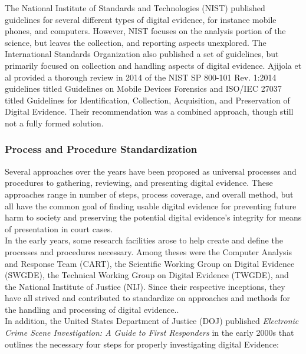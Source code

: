 \documentclass[12pt]{article}
\begin{document}
The National Institute of Standards and Technologies (NIST) published guidelines for several
different types of digital evidence, for instance mobile phones, and computers.
However, NIST focuses on the analysis portion of the science, but leaves the collection,
and reporting aspects unexplored.  The International Standards Organization also published
a set of guidelines, but primarily focused on collection and handling aspects of digital
evidence.  
Ajijola et al\cite{ajijola2014review} provided a thorough review in 2014 of the NIST SP
800-101 Rev. 1:2014 guidelines
titled Guidelines on Mobile Devices Forensics and ISO/IEC 27037 titled
Guidelines for
Identification, Collection, Acquisition, and Preservation of Digital Evidence.
Their recommendation was a combined approach, though still not a fully formed solution.\\

\subsubsection{Process and Procedure Standardization}

Several approaches over the years have been proposed as universal processes and procedures to
gathering, reviewing, and presenting digital evidence.  These approaches range in number of
steps, process coverage, and overall method, 
but all have the common goal of finding usable digital evidence for preventing future
harm to society and preserving the potential digital evidence's 
integrity for means of presentation in court cases.\\

In the early years, some research facilities arose to help create and define the processes
and procedures necessary.  Among theses were the Computer Analysis and
Response Team (CART), the Scientific Working Group on Digital Evidence (SWGDE), the
Technical Working Group on Digital Evidence (TWGDE), and the National Institute of
Justice (NIJ).  Since their respective inceptions, they have all strived and 
contributed to standardize on approaches and methods for 
the handling and processing of digital evidence.\cite{noblett2000recovering}.\\

In addition, the United States Department of Justice (DOJ) published 
{\em Electronic Crime Scene Investigation: A Guide to First Responders}
\cite{ballou2010electronic} in the early 2000s that outlines
the necessary four steps for properly investigating digital Evidence:
\end{document}

